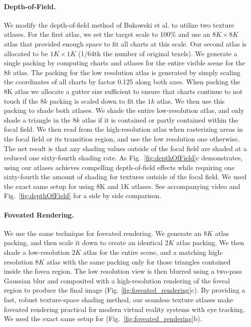 \paragraph*{Depth-of-Field.} 
We modify the depth-of-field method of Bukowski et al.  to utilize two texture atlases. For the first atlas, we set the target scale to 100\% and use an $8K \times 8K$ atlas that provided enough space to fit all charts at this scale. Our second atlas is allocated to be  $1K \times 1K$ (1/64th the number of original texels). We generate a single packing by computing charts and atlases for the entire visible scene for the $8k$ atlas. 
The packing for the low resolution atlas is generated by simply scaling the coordinates of all charts by factor 0.125 along both axes. When packing the 8K atlas we allocate a gutter size sufficient to ensure that charts continue to not touch if the $8k$ packing is scaled down to fit the $1k$ atlas. We then use this packing to shade both atlases. We shade the entire low-resolution atlas, and only shade a triangle in the $8k$ atlas if it is contained or partly contained within the focal field. We then read from the high-resolution atlas when rasterizing areas in the focal field or its transition region, and use the low resolution one otherwise. The net result is that any shading values outside of the focal field are shaded at a reduced one sixty-fourth shading rate. As  Fig.~\ref{fig:depthOfField}c demonstrates, using our atlases achieves compelling depth-of-field effects while requiring one sixty-fourth the amount of shading for textures outside of the focal field.
We used the exact same setup for \cite{Neff2022MSA} using 8K and 1K atlases. See accompanying video and Fig.~\ref{fig:depthOfField} for a side by side comparison.  

\paragraph*{Foveated Rendering.} We use the same technique for foveated rendering. We generate an $8K$ atlas packing, and then scale it down to create an identical $2K$ atlas packing. We then shade a low-resolution $2K$ atlas for the entire scene, and a matching high-resolution $8K$ atlas with the same packing only for those triangles contained inside the fovea region. The low resolution view is then blurred using a two-pass Gaussian blur and composited with a high-resolution rendering of the foveal region to produce the final image (Fig. \ref{fig:foveated_rendering}c). By providing a fast, robust texture-space shading method, our seamless texture atlases make foveated rendering practical for modern virtual reality systems with eye tracking. We used the exact same setup for \cite{Neff2022MSA} (Fig.~\ref{fig:foveated_rendering}b).

